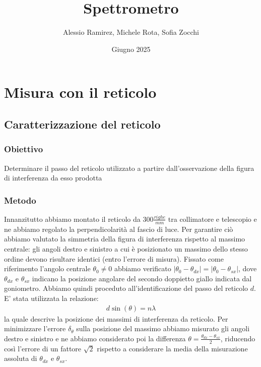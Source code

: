 \documentclass[a4paper]{article}
\title{Spettrometro}
\author{Alessio Ramirez, Michele Rota, Sofia Zocchi}
\date{Giugno 2025}
\begin{document}
\maketitle
\tableofcontents
\newpage
\section{Misura con il reticolo}

\subsection{Caratterizzazione del reticolo}
\subsubsection{Obiettivo}
Determinare il passo del reticolo utilizzato a partire dall'osservazione della figura di interferenza da esso prodotta

\subsubsection{Metodo}
Innanzitutto abbiamo montato il reticolo da $300 \frac{righe}{mm}$ tra collimatore e telescopio e ne abbiamo regolato la perpendicolarità al fascio di luce. Per garantire ciò abbiamo valutato la simmetria della figura di interferenza rispetto al massimo centrale: gli angoli destro e sinistro a cui è posizionato un massimo dello stesso ordine devono risultare identici (entro l'errore di misura). Fissato come riferimento l'angolo centrale $\theta_0 \neq 0$ abbiamo verificato $|\theta_0 -\theta_{dx}|=|\theta_0 -\theta_{sx}|$, dove $\theta_{dx}$ e $\theta_{sx}$ indicano la posizione angolare del secondo doppietto giallo indicata dal goniometro. Abbiamo quindi proceduto all'identificazione del passo del reticolo $d$. E' stata utilizzata la relazione:
\begin{align}
 d\sin(\theta) = n\lambda
\label{eq:massimi reticolo}
\end{align}
la quale descrive la posizione dei massimi di interferenza da reticolo. 
Per minimizzare l'errore $\delta_{\theta}$ sulla posizione del massimo abbiamo misurato gli angoli destro e sinistro e ne abbiamo considerato poi la differenza $\theta = \frac{\theta_{dx}-\theta_{sx}}{2}$, riducendo così l'errore di un fattore $\sqrt{2}$ rispetto a considerare la media della misurazione assoluta di $\theta_{dx}$ e $\theta_{sx}$. 
\end{document}
